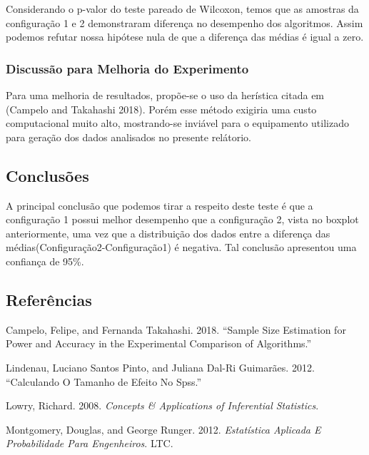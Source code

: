\documentclass[]{article}
\begin{document}
Considerando o p-valor do teste pareado de Wilcoxon, temos que as
amostras da configuração 1 e 2 demonstraram diferença no desempenho dos
algoritmos. Assim podemos refutar nossa hipótese nula de que a diferença
das médias é igual a zero.

\hypertarget{discussao-para-melhoria-do-experimento}{%
\subsubsection{Discussão para Melhoria do
Experimento}\label{discussao-para-melhoria-do-experimento}}

Para uma melhoria de resultados, propõe-se o uso da herística citada em
(Campelo and Takahashi 2018). Porém esse método exigiria uma custo
computacional muito alto, mostrando-se inviável para o equipamento
utilizado para geração dos dados analisados no presente relátorio.

\hypertarget{conclusoes}{%
\subsection{Conclusões}\label{conclusoes}}

A principal conclusão que podemos tirar a respeito deste teste é que a
configuração 1 possui melhor desempenho que a configuração 2, vista no
boxplot anteriormente, uma vez que a distribuição dos dados entre a
diferença das médias(Configuração2-Configuração1) é negativa. Tal
conclusão apresentou uma confiança de 95\%.

\hypertarget{referencias}{%
\subsection*{Referências}\label{referencias}}

\hypertarget{refs}{}
\leavevmode\hypertarget{ref-Campelo}{}%
Campelo, Felipe, and Fernanda Takahashi. 2018. ``Sample Size Estimation
for Power and Accuracy in the Experimental Comparison of Algorithms.''

\leavevmode\hypertarget{ref-Lindenau}{}%
Lindenau, Luciano Santos Pinto, and Juliana Dal-Ri Guimarães. 2012.
``Calculando O Tamanho de Efeito No Spss.''

\leavevmode\hypertarget{ref-Wilcox}{}%
Lowry, Richard. 2008. \emph{Concepts \& Applications of Inferential
Statistics}.

\leavevmode\hypertarget{ref-Montgomery2012}{}%
Montgomery, Douglas, and George Runger. 2012. \emph{Estatística Aplicada
E Probabilidade Para Engenheiros}. LTC.
\end{document}
